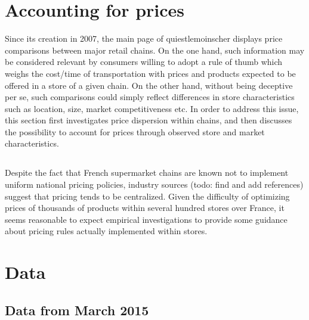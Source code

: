 \documentclass[english]{article}
\begin{document}
\section{Accounting for prices}

Since its creation in 2007, the main page of quiestlemoinscher displays price comparisons between major retail chains. On the one hand, such information may be considered relevant by consumers willing to adopt a rule of thumb which weighs the cost/time of transportation with prices and products expected to be offered in a store of a given chain. On the other hand, without being deceptive per se, such comparisons could simply reflect differences in store characteristics such as location, size, market competitiveness etc. In order to address this issue, this section first investigates price dispersion within chains, and then discusses the possibility to account for prices through observed store and market characteristics.

\subsection{}

Despite the fact that French supermarket chains are known not to implement uniform national pricing policies, industry sources (todo: find and add references) suggest that pricing tends to be centralized. Given the difficulty of optimizing prices of thousands of products within several hundred stores over France, it seems reasonable to expect empirical investigations to provide some guidance about pricing rules actually implemented within stores.

\newpage



\newpage

\appendix

\section{Data}

\subsection{Data from March 2015}
\end{document}
